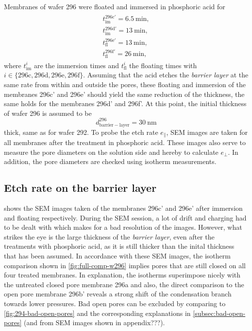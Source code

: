 \documentclass[../thesis.tex]{subfiles}
\begin{document}
        Membranes of wafer 296 were floated and immersed in phosphoric acid for
        \begin{align*}
            \begin{split}
                t_\mathrm{im}^\mathrm{296c'}=\SI{6,5}{\minute}, \\
                t_\mathrm{im}^\mathrm{296d'}=\SI{13}{\minute},  \\
                t_\mathrm{fl}^\mathrm{296e'}=\SI{13}{\minute}, \\
                t_\mathrm{fl}^\mathrm{296f'}=\SI{26}{\minute},
            \end{split}
        \end{align*}
        where $t_\mathrm{im}^{i}$ are the immersion times and $t_\mathrm{fl}^{i}$ the floating times with $i\in \{ \mathrm{296c,296d,296e,296f}\}$. Assuming that the acid etches the \textit{barrier layer} at the same rate from within and outside the pores, these floating and immersion of the membranes 296c' and 296e' should yield the same reduction of the thickness, the same holds for the membranes 296d' and 296f'. At this point, the initial thickness of wafer 296 is assumed to be
        \begin{equation*}
          d_\mathrm{barrier-layer}^\mathrm{296} =\SI{30}{\nano\meter}
        \end{equation*}
        thick, same as for wafer 292. To probe the etch rate $e_\parallel$, SEM images are taken for all membranes after the treatment in phosphoric acid. These images also serve to measure the pore diameters on the solution side and hereby to calculate $e_\perp$. In addition, the pore diameters are checked using isotherm measurements.


        \subsection{Etch rate on the barrier layer}
        \label{subsec:etch-rate}

          

           shows the SEM images taken of the membranes 296c' and 296e' after immersion and floating respectively. During the SEM session, a lot of drift and charging had to be dealt with which makes for a bad resolution of the images. However, what strikes the eye is the large thickness of the \textit{barrier layer}, even after the treatments with phosphoric acid, as it is still thicker than the inital thickness that has been assumed. In accordance with these SEM images, the isotherm comparison shown in \cref{fig:full-comp-w296} implies pores that are still closed on all four treated membranes. In explanation, the isotherms superimpose nicely with the untreated closed pore membrane 296a and also, the direct comparison to the open pore membrane 296b' reveals a strong shift of the condensation branch towards lower pressures. Bad open pores can be excluded by comparing to \cref{fig:294-bad-open-pores} and the corresponding explanations in \cref{subsec:bad-open-pores} (and from SEM images shown in appendix???).
\end{document}
